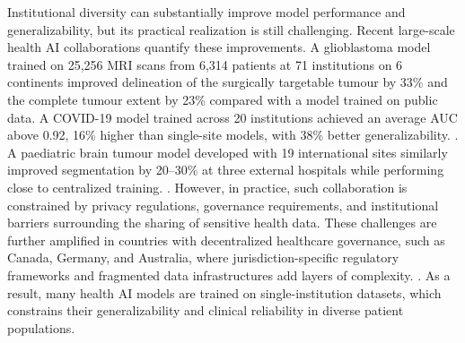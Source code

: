 \documentclass[preprint,5p, 10pt, times]{elsarticle}
\begin{document}
Institutional diversity can substantially improve model performance and generalizability, but its practical realization is still challenging.
Recent large-scale health AI collaborations quantify these improvements.
% 
A glioblastoma model trained on 25,256 MRI scans from 6,314 patients at 71 institutions on 6 continents improved delineation of the surgically targetable tumour by 33\% and the complete tumour extent by 23\% compared with a model trained on public data\cite{pati2022federated}.
%
A COVID-19 model trained across 20 institutions achieved an average AUC above 0.92, 16\% higher than single-site models, with 38\% better generalizability.
\cite{dayan2021federated}.
%
A paediatric brain tumour model developed with 19 international sites similarly improved segmentation by 20–30\% at three external hospitals while performing close to centralized training.
\cite{lee2024international}.
However, in practice, such collaboration is constrained by privacy regulations, governance requirements, and institutional barriers surrounding the sharing of sensitive health data. 
These challenges are further amplified in countries with decentralized healthcare governance, such as Canada, Germany, and Australia, where jurisdiction-specific regulatory frameworks and fragmented data infrastructures add layers of complexity.
\cite{alami2024understanding,hassan2024barriers}.
As a result, many health AI models are trained on single-institution datasets, which constrains their generalizability and clinical reliability in diverse patient populations\cite{suleman2025assessing, arun2025systematic,pandian2025generalizing,naderian2025systematic}.
\end{document}
